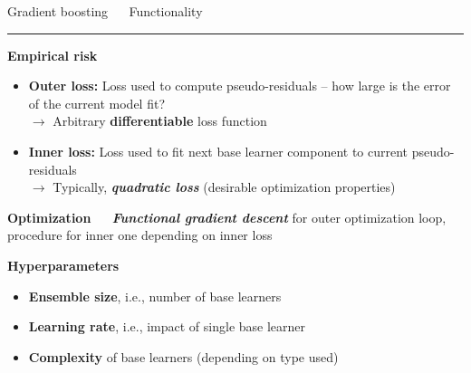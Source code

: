 \documentclass[11pt,compress,t,notes=noshow, xcolor=table]{beamer}
\begin{document}
\LARGE
\begin{frame}{\textcolor{gray!80}{Gradient boosting} ~~ Functionality}
\normalsize
\vspace{-0.5cm}
\noindent \textcolor{gray!80}{\rule{\textwidth}{1pt}}

\vspace{0.3cm}

\footnotesize

\textbf{\textcolor{gray!80}{Empirical risk}}

\begin{itemize}
  \item \textbf{Outer loss:} Loss used to compute pseudo-residuals -- how large 
  is the error of the current model fit? \\
  $\rightarrow$ Arbitrary \textbf{differentiable} loss function
  \item \textbf{Inner loss:} Loss used to fit next base learner component to 
  current pseudo-residuals \\
  $\rightarrow$ Typically, \textit{\textbf{quadratic loss}} (desirable 
  optimization properties)
\end{itemize}

\medskip

\textbf{\textcolor{gray!80}{Optimization}} ~~ \textit{\textbf{Functional 
gradient descent}} for outer optimization loop, procedure for inner one 
depending on inner loss

\medskip

\textbf{\textcolor{gray!80}{Hyperparameters}}

\begin{itemize}
  \item \textbf{Ensemble size}, i.e., number of base learners
  \item \textbf{Learning rate}, i.e., impact of single base learner
  \item \textbf{Complexity} of base learners (depending on type used)
\end{itemize}

\end{frame}

\end{document}
